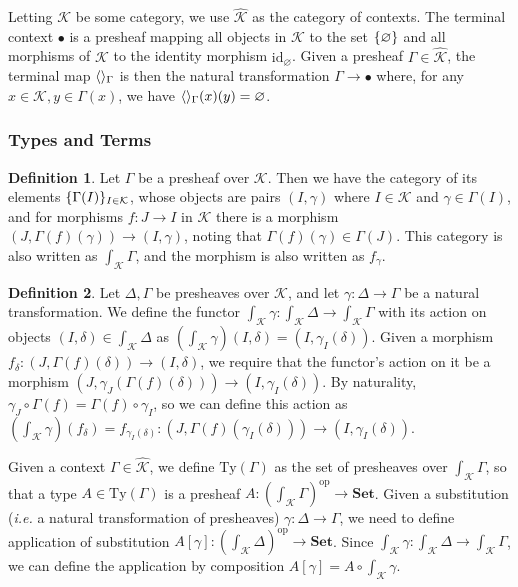 \documentclass{article}
\makeatletter
\newcommand{\ie}{\textit{i.e.}\@\xspace}
\renewcommand{\_}{\textrm{\textscale{.5}{\textunderscore}}}
\DeclarePairedDelimiter{\ctxt}{\langle}{\rangle}
\DeclarePairedDelimiter{\set}{\{}{\}}
\newcommand{\op}[1]{#1^{\mathrm{op}}}
\newcommand{\cat}[1]{\textbf{#1}}
\newcommand{\Ty}{\mathrm{Ty}}
\newcommand{\id}{\mathrm{id}}
\theoremstyle{definition}
\newtheorem{definition}{Definition}[section]
\theoremstyle{plain}
\makeatother
\begin{document}
Letting $\mathcal{K}$ be some category,
we use $\widehat{\mathcal{K}}$ as the category of contexts.
The terminal context $\bullet$ is a presheaf mapping all objects in $\mathcal{K}$
to the set $\set{\varnothing}$ and all morphisms of $\mathcal{K}$
to the identity morphism $\id_{\varnothing}$.
Given a presheaf $\Gamma \in \widehat{\mathcal{K}}$,
the terminal map $\ctxt{}_\Gamma$ is then the natural transformation $\Gamma \to \bullet$ where,
for any $x \in \mathcal{K}, y \in \Gamma(x)$, we have $\ctxt{}_\Gamma(x)(y) = \varnothing$.

\subsubsection{Types and Terms}

\begin{definition}
Let $\Gamma$ be a presheaf over $\mathcal{K}$.
Then we have the category of its elements $\set{\Gamma(I)}_{I \in \mathcal{K}}$,
whose objects are pairs $(I, \gamma)$ where $I \in \mathcal{K}$ and $\gamma \in \Gamma(I)$,
and for morphisms $f : J \to I$ in $\mathcal{K}$
there is a morphism $(J, \Gamma(f)(\gamma)) \to (I, \gamma)$,
noting that $\Gamma(f)(\gamma) \in \Gamma(J)$.
This category is also written as $\int_\mathcal{K} \Gamma$,
and the morphism is also written as $f_\gamma$.
\end{definition}

\begin{definition}
Let $\Delta, \Gamma$ be presheaves over $\mathcal{K}$,
and let $\gamma : \Delta \to \Gamma$ be a natural transformation.
We define the functor $\int_{\mathcal{K}} \gamma : \int_{\mathcal{K}} \Delta \to \int_{\mathcal{K}} \Gamma$
with its action on objects $(I, \delta) \in \int_{\mathcal{K}} \Delta$
as $(\int_{\mathcal{K}} \gamma)(I, \delta) = (I, \gamma_I(\delta))$.
Given a morphism $f_\delta : (J, \Gamma(f)(\delta)) \to (I, \delta)$,
we require that the functor's action on it be a morphism $(J, \gamma_J(\Gamma(f)(\delta))) \to (I, \gamma_I(\delta))$.
By naturality, $\gamma_J \circ \Gamma(f) = \Gamma(f) \circ \gamma_I$,
so we can define this action as
$(\int_{\mathcal{K}} \gamma)(f_\delta) = f_{\gamma_I(\delta)} : (J, \Gamma(f)(\gamma_I(\delta))) \to (I, \gamma_I(\delta))$.
\end{definition}

Given a context $\Gamma \in \widehat{\mathcal{K}}$, we define $\Ty(\Gamma)$ as the set of presheaves over $\int_\mathcal{K} \Gamma$,
so that a type $A \in \Ty(\Gamma)$ is a presheaf $A : \op{(\int_{\mathcal{K}} \Gamma)} \to \cat{Set}$.
Given a substitution (\ie a natural transformation of presheaves) $\gamma : \Delta \to \Gamma$,
we need to define application of substitution $A[\gamma] : \op{(\int_{\mathcal{K}} \Delta)} \to \cat{Set}$.
Since $\int_{\mathcal{K}} \gamma : \int_{\mathcal{K}} \Delta \to \int_{\mathcal{K}} \Gamma$,
we can define the application by composition $A[\gamma] = A \circ \int_{\mathcal{K}} \gamma$.
\end{document}

